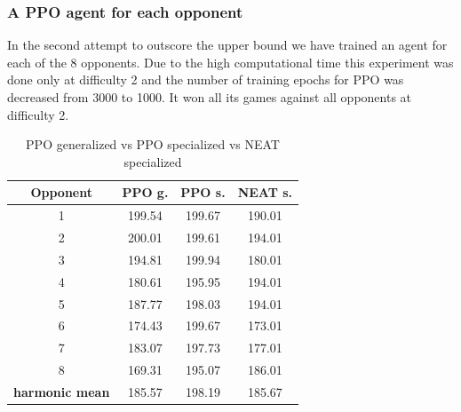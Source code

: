 \documentclass[conference]{IEEEtran}
\begin{document}
    \subsubsection{A PPO agent for each opponent}
    In the second attempt to outscore the upper bound we have trained an agent
    for each of the $8$ opponents.
    Due to the high computational time this experiment was done only at
    difficulty 2 and the number of training epochs for PPO was decreased from 3000 to 1000.
    It won all its games against all opponents at difficulty 2.
    \begin{table}[htbp]
        \caption{PPO generalized vs PPO specialized vs NEAT specialized}
        \begin{center}
            \begin{tabular}{|c|c|c|c|}
                \hline
                \textbf{Opponent}      & \textbf{PPO g.} & \textbf{PPO s.} & \textbf{NEAT s.} \\
                \hline
                1                      & 199.54          & 199.67          & 190.01           \\
                2                      & 200.01          & 199.61          & 194.01           \\
                3                      & 194.81          & 199.94          & 180.01           \\
                4                      & 180.61          & 195.95          & 194.01           \\
                5                      & 187.77          & 198.03          & 194.01           \\
                6                      & 174.43          & 199.67          & 173.01           \\
                7                      & 183.07          & 197.73          & 177.01           \\
                8                      & 169.31          & 195.07          & 186.01           \\
                \hline
                \textbf{harmonic mean} & 185.57          & 198.19          & 185.67           \\
                \hline
            \end{tabular}
            \label{PPO generalized vs specialized vs NEAT}
        \end{center}
    \end{table}
\end{document}
